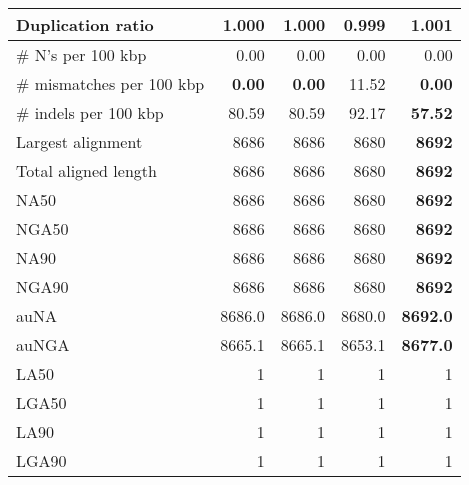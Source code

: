 \documentclass[12pt,a4paper]{article}
\begin{document}
\begin{table}[ht]
\begin{center}
\begin{tabular}{|l*{4}{|r}|}
Duplication ratio & 1.000 & 1.000 & {\bf 0.999} & 1.001 \\ \hline
\# N's per 100 kbp & 0.00 & 0.00 & 0.00 & 0.00 \\ \hline
\# mismatches per 100 kbp & {\bf 0.00} & {\bf 0.00} & 11.52 & {\bf 0.00} \\ \hline
\# indels per 100 kbp & 80.59 & 80.59 & 92.17 & {\bf 57.52} \\ \hline
Largest alignment & 8686 & 8686 & 8680 & {\bf 8692} \\ \hline
Total aligned length & 8686 & 8686 & 8680 & {\bf 8692} \\ \hline
NA50 & 8686 & 8686 & 8680 & {\bf 8692} \\ \hline
NGA50 & 8686 & 8686 & 8680 & {\bf 8692} \\ \hline
NA90 & 8686 & 8686 & 8680 & {\bf 8692} \\ \hline
NGA90 & 8686 & 8686 & 8680 & {\bf 8692} \\ \hline
auNA & 8686.0 & 8686.0 & 8680.0 & {\bf 8692.0} \\ \hline
auNGA & 8665.1 & 8665.1 & 8653.1 & {\bf 8677.0} \\ \hline
LA50 & 1 & 1 & 1 & 1 \\ \hline
LGA50 & 1 & 1 & 1 & 1 \\ \hline
LA90 & 1 & 1 & 1 & 1 \\ \hline
LGA90 & 1 & 1 & 1 & 1 \\ \hline
\end{tabular}
\end{center}
\end{table}
\end{document}
